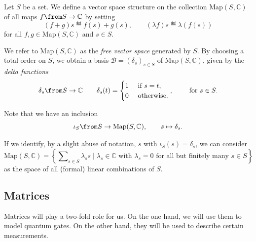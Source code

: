 \documentclass[a4paper,oneside, 12pt]{amsart}
\begin{document}
\begin{example}\label{ex:free-vector-space}
  Let \(S\) be a set.
  We define a vector space structure on the collection \(\mathrm{Map}(S, \mathbb{C})\) of all  maps \(f \from S \to \mathbb{C}  \) by setting
  \begin{equation*}
    (f+g)s \eqdef f(s) + g(s), \qquad (\lambda f) s \eqdef \lambda (f(s))
  \end{equation*}
  for all \(f,g \in \mathrm{Map}(S, \mathbb{C})\) and \(s \in S\).

  We refer to \(\mathrm{Map}(S, \mathbb{C})\) as the \emph{free vector space} generated by \(S\).
  By choosing a total order on \(S\), we obtain a basis \(\mathcal{B}= (\delta_{s})_{s\in S}\) of \(\mathrm{Map}(S, \mathbb{C})\), given by the \emph{delta functions}
  \begin{equation}
    \delta_{s} \from S \to \mathbb{C}\qquad \delta_{s}(t) =
    \begin{cases}
      1 & \text{ if } s= t, \\
      0 & \text{ otherwise}.
    \end{cases}, \qquad \text{ for } s\in S.
  \end{equation}

  Note that we have an inclusion
  \begin{equation*}
    \iota_{S} \from S \to \mathrm{Map}(S, \mathbb{C}), \qquad
    s \mapsto \delta_{s}.
  \end{equation*}

  If we identify,  by a slight abuse of notation, \(s\) with \(\iota_{S}(s) = \delta_{s}\), we can consider
  \begin{equation}
    \mathrm{Map}(S, \mathbb{C}) = \left\{\sum\nolimits_{s\in S} \lambda_{s} s \mid \lambda_{s}\in \mathbb{C} \text{ with } \lambda_{s}= 0 \text{ for all but finitely many } s\in S\right\}
  \end{equation}
  as the space of all (formal) linear combinations of \(S\).
\end{example}

\subsection{Matrices}\label{sec:matrices}
Matrices will play a two-fold role for us.
On the one hand, we will use them to model quantum gates.
On the other hand, they will be used to describe certain measurements.
\bigskip
\end{document}
